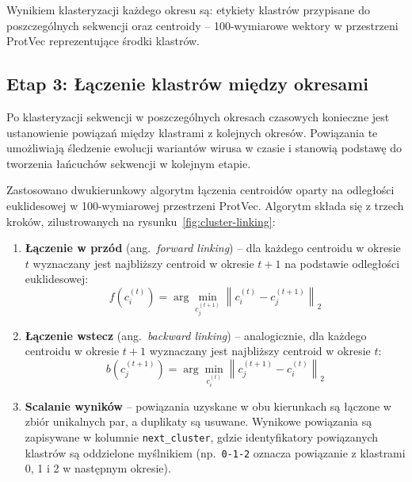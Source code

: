 Wynikiem klasteryzacji każdego okresu są: etykiety klastrów przypisane do poszczególnych sekwencji oraz centroidy -- 100-wymiarowe wektory w przestrzeni ProtVec reprezentujące środki klastrów.

\subsection{Etap 3: Łączenie klastrów między okresami}
\label{subsec:laczenie-klastrow}

Po klasteryzacji sekwencji w poszczególnych okresach czasowych konieczne jest ustanowienie powiązań między klastrami z kolejnych okresów. Powiązania te umożliwiają śledzenie ewolucji wariantów wirusa w czasie i stanowią podstawę do tworzenia łańcuchów sekwencji w kolejnym etapie.

Zastosowano dwukierunkowy algorytm łączenia centroidów oparty na odległości euklidesowej w 100-wymiarowej przestrzeni ProtVec. Algorytm składa się z trzech kroków, zilustrowanych na rysunku~\ref{fig:cluster-linking}:

\begin{enumerate}
    \item \textbf{Łączenie w przód} (ang.~\emph{forward linking}) -- dla każdego centroidu w okresie $t$ wyznaczany jest najbliższy centroid w okresie $t+1$ na podstawie odległości euklidesowej:
    \begin{equation}
    \label{eq:forward-link}
    f(c_i^{(t)}) = \arg\min_{c_j^{(t+1)}} \left\| c_i^{(t)} - c_j^{(t+1)} \right\|_2
    \end{equation}

    \item \textbf{Łączenie wstecz} (ang.~\emph{backward linking}) -- analogicznie, dla każdego centroidu w okresie $t+1$ wyznaczany jest najbliższy centroid w okresie $t$:
    \begin{equation}
    \label{eq:backward-link}
    b(c_j^{(t+1)}) = \arg\min_{c_i^{(t)}} \left\| c_j^{(t+1)} - c_i^{(t)} \right\|_2
    \end{equation}

    \item \textbf{Scalanie wyników} -- powiązania uzyskane w obu kierunkach są łączone w zbiór unikalnych par, a duplikaty są usuwane. Wynikowe powiązania są zapisywane w kolumnie \texttt{next\_cluster}, gdzie identyfikatory powiązanych klastrów są oddzielone myślnikiem (np.~\texttt{0-1-2} oznacza powiązanie z klastrami 0, 1 i 2 w następnym okresie).
\end{enumerate}

